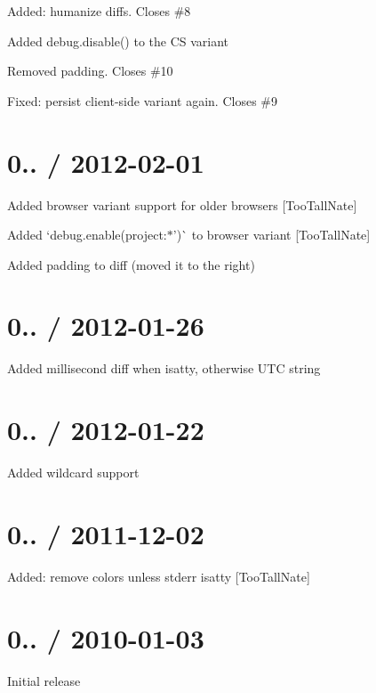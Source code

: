\begin{DoxyItemize}
\item Added\+: humanize diffs. Closes \#8
\item Added {\ttfamily debug.\+disable()} to the CS variant
\item Removed padding. Closes \#10
\item Fixed\+: persist client-\/side variant again. Closes \#9
\end{DoxyItemize}

\section*{0.. / 2012-\/02-\/01 }


\begin{DoxyItemize}
\item Added browser variant support for older browsers \mbox{[}Too\+Tall\+Nate\mbox{]}
\item Added `debug.\+enable(\textquotesingle{}project\+:$\ast$')\`{} to browser variant \mbox{[}Too\+Tall\+Nate\mbox{]}
\item Added padding to diff (moved it to the right)
\end{DoxyItemize}

\section*{0.. / 2012-\/01-\/26 }


\begin{DoxyItemize}
\item Added millisecond diff when isatty, otherwise U\+TC string
\end{DoxyItemize}

\section*{0.. / 2012-\/01-\/22 }


\begin{DoxyItemize}
\item Added wildcard support
\end{DoxyItemize}

\section*{0.. / 2011-\/12-\/02 }


\begin{DoxyItemize}
\item Added\+: remove colors unless stderr isatty \mbox{[}Too\+Tall\+Nate\mbox{]}
\end{DoxyItemize}

\section*{0.. / 2010-\/01-\/03 }


\begin{DoxyItemize}
\item Initial release 
\end{DoxyItemize}